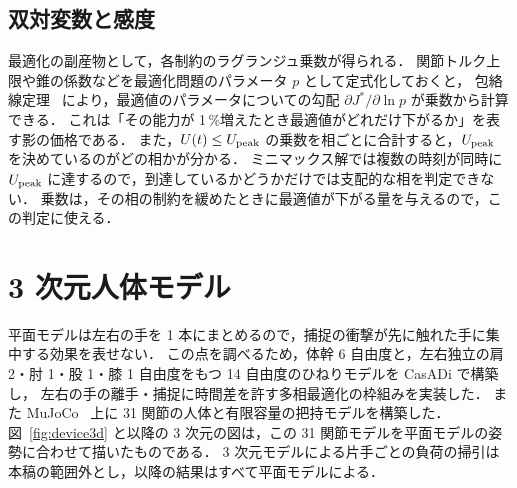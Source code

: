 \subsection{双対変数と感度}
最適化の副産物として，各制約のラグランジュ乗数が得られる．
関節トルク上限や錐の係数などを最適化問題のパラメータ $p$ として定式化しておくと，
包絡線定理~\cite{fiacco1976,buskens2001} により，最適値のパラメータについての勾配 $\partial J^*/\partial\ln p$ が乗数から計算できる．
これは「その能力が 1\,\%増えたとき最適値がどれだけ下がるか」を表す影の価格である．
また，$U(t)\le U_{\mathrm{peak}}$ の乗数を相ごとに合計すると，$U_{\mathrm{peak}}$ を決めているのがどの相かが分かる．
ミニマックス解では複数の時刻が同時に $U_{\mathrm{peak}}$ に達するので，到達しているかどうかだけでは支配的な相を判定できない．
乗数は，その相の制約を緩めたときに最適値が下がる量を与えるので，この判定に使える．

\section{3 次元人体モデル}
\label{sec:spatial}
平面モデルは左右の手を 1 本にまとめるので，捕捉の衝撃が先に触れた手に集中する効果を表せない．
この点を調べるため，体幹 6 自由度と，左右独立の肩 2・肘 1・股 1・膝 1 自由度をもつ 14 自由度のひねりモデルを CasADi で構築し，
左右の手の離手・捕捉に時間差を許す多相最適化の枠組みを実装した．
また MuJoCo~\cite{todorov2012} 上に 31 関節の人体と有限容量の把持モデルを構築した．
図~\ref{fig:device3d} と以降の 3 次元の図は，この 31 関節モデルを平面モデルの姿勢に合わせて描いたものである．
3 次元モデルによる片手ごとの負荷の掃引は本稿の範囲外とし，以降の結果はすべて平面モデルによる．
